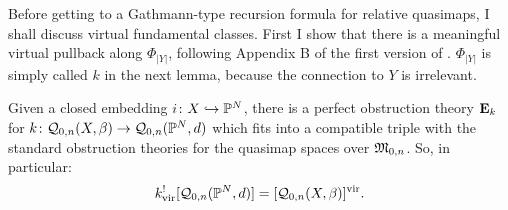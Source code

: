 Before getting to a Gathmann-type recursion formula for relative quasimaps, I shall discuss virtual fundamental classes. First I show that there is a meaningful virtual pullback along $\Phi_{|Y|}$, following Appendix B of the first version of \cite{BN}. $\Phi_{|Y|}$ is simply called $k$ in the next lemma, because the connection to $Y$ is irrelevant.

\begin{lem} \label{Exists relative POT} Given a closed embedding $i\colon X \hookrightarrow \mathbb P^N$, there is a perfect obstruction theory $\mathbf{E}_k$ for
$ k \colon \mathcal{Q}_{0,n}(X,\beta) \rightarrow \mathcal{Q}_{0,n}(\mathbb P^N,d) $
which fits into a compatible triple with the standard obstruction theories for the quasimap spaces over $\mathfrak M_{0,n}$. So, in particular:
\begin{equation*} k^!_{\operatorname{vir}} [ \mathcal{Q}_{0,n}(\mathbb P^N,d) ] = [\mathcal{Q}_{0,n}(X,\beta)]^{\mathrm{vir}}. \end{equation*} \end{lem}

